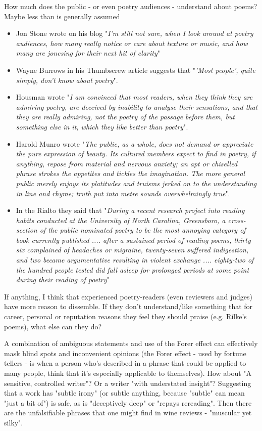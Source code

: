 \documentclass[11pt]{article}
\begin{document}
How much does the public - or even poetry audiences - understand about poems? Maybe less than is generally assumed
\begin{itemize}
\item Jon Stone wrote on his blog "\textit{I'm still not sure, when I look around at poetry audiences, how many really notice or care about texture or music, and how many are jonesing for their next hit of clarity}"
\item Wayne Burrows in his Thumbscrew article suggests that "\textit{'Most people', quite simply, don’t know about poetry}".
\item Housman wrote "\textit{I am convinced that most readers, when they think they are admiring poetry, are deceived by inability to analyse their sensations, and that they are really admiring, not the poetry of the passage before them, but something else in it, which they like better than poetry}".
\item Harold Munro wrote "\textit{The public, as a whole, does not demand or appreciate the pure expression of beauty. Its cultured members expect to find in poetry, if anything, repose from material and nervous anxiety; an apt or chiselled phrase strokes the appetites and tickles the imagination. The more general public merely enjoys its platitudes and truisms jerked on to the understanding in line and rhyme; truth put into metre sounds overwhelmingly true}".
\item In the Rialto they said that "\textit{During a recent research project into reading habits conducted at the University of North Carolina, Greensboro, a cross-section of the public nominated poetry to be the most annoying category of book currently published .... after a sustained period of reading poems, thirty six complained of headaches or migraine, twenty-seven suffered indigestion, and two became argumentative resulting in violent exchange .... eighty-two of the hundred people tested did fall asleep for prolonged periods at some point during their reading of poetry}"

\end{itemize}


If anything, I think that experienced poetry-readers (even reviewers and judges) have more reason to dissemble. If they don't understand/like something that for career, personal or reputation reasons they feel they should praise (e.g. Rilke's poems), what else can they do?

 A combination of ambiguous statements and use of the Forer effect can effectively mask blind spots and inconvenient opinions (the Forer effect - used by fortune tellers - is when a person who's described in a phrase that could be applied to many people, think that it's especially applicable to themselves). How about "A sensitive, controlled writer"? Or a writer "with understated insight"? Suggesting that a work has "subtle irony" (or subtle anything, because "subtle" can mean "just a bit of") is safe, as is "deceptively deep" or "repays rereading". Then there are the unfalsifiable phrases that one might find in wine reviews - "muscular yet silky".
\end{document}
